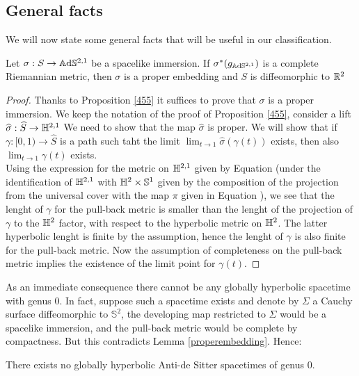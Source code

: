 \subsection{General facts} We will now state some general facts that will be useful in our classification.

\begin{lemma}\label{properembedding}
    Let $\sigma:S\to\mathbb{A}\mathrm{d}\mathbb{S}^{2,1}$ be a spacelike immersion. If $\sigma^*(g_{\mathbb{A}\mathrm{d}\mathbb{S}^{2,1}})$ is a complete Riemannian metric, then $\sigma$ is a proper embedding and $S$ is diffeomorphic to $\mathbb{R}^2$
\end{lemma}
\begin{proof}
    Thanks to Proposition \ref{455} it suffices to prove that $\sigma$ is a proper immersion. We keep the notation of the proof of Proposition \ref{455}, consider a lift $\widehat{\sigma}:\widehat{S}\to\mathbb{H}^{2,1}$ We need to show that the map $\widehat{\sigma}$ is proper. We will show that if $\gamma:[0,1)\to\widehat{S}$ is a path such taht the limit $\lim_{t\to 1}\widehat{\sigma}(\gamma(t))$ exists, then also $\lim_{t \to 1}\gamma(t)$ exists. \\
    Using the expression for the metric on $\mathbb{H}^{2,1}$ given by Equation  (under the identification of $\mathbb{H}^{2,1}$ with $\mathbb{H}^{2}\times\mathbb{S}^{1}$ given by the composition of the projection from the universal cover with the map $\pi$ given in Equation ), we see that the lenght of $\gamma$ for the pull-back metric is smaller than the lenght of the projection of $\gamma$ to the $\mathbb{H}^2$ factor, with respect to the hyperbolic metric on $\mathbb{H}^2$. The latter hyperbolic lenght is finite by the assumption, hence the lenght of $\gamma$ is also finite for the pull-back metric. Now the assumption of completeness on the pull-back metric implies the existence of the limit point for $\gamma(t)$.
\end{proof}

As an immediate consequence there cannot be any globally hyperbolic spacetime with genus $0$. In fact, suppose such a spacetime exists and denote by $\Sigma$ a Cauchy surface diffeomorphic to $\mathbb{S}^2$, the developing map restricted to $\Sigma$ would be a spacelike immersion, and the pull-back metric would be complete by compactness. But this contradicts Lemma \ref{properembedding}. Hence: 

\begin{corollary}
    There exists no globally hyperbolic Anti-de Sitter spacetimes of genus 0. 
\end{corollary}

